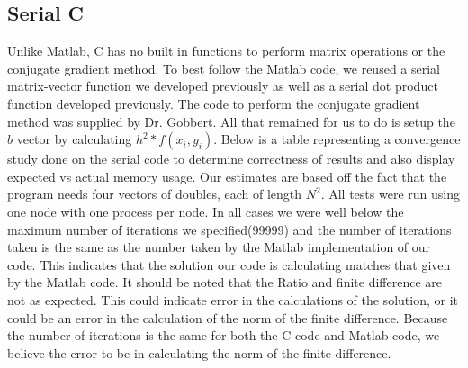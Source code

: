 \documentclass[11pt]{article}
\begin{document}
\subsection{Serial C}
Unlike Matlab, C has no built in functions to perform matrix operations or the conjugate gradient method. To best follow the Matlab code, we reused a serial matrix-vector function we developed previously as well as a serial dot product function developed previously. The code to perform the conjugate gradient method was supplied by Dr. Gobbert. All that remained for us to do is setup the $b$ vector by calculating $h^2 * f(x_i, y_i)$. Below is a table representing a convergence study done on the serial code to determine correctness of results and also display expected vs actual memory usage. Our estimates are based off the fact that the program needs four vectors of doubles, each of length $N^2$. All tests were run using one node with one process per node. In all cases we were well below the maximum number of iterations we specified(99999) and the number of iterations taken is the same as the number taken by the Matlab implementation of our code. This indicates that the solution our code is calculating matches that given by the Matlab code. It should be noted that the Ratio and finite difference are not as expected. This could indicate error in the calculations of the solution, or it could be an error in the calculation of the norm of the finite difference. Because the number of iterations is the same for both the C code and Matlab code, we believe the error to be in calculating the norm of the finite difference.
\end{document}
